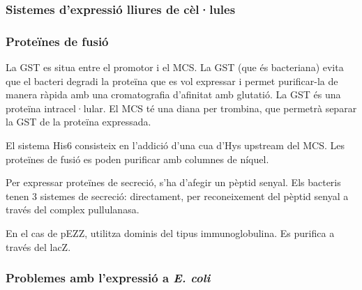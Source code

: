 \subsubsection{Sistemes d'expressió lliures de cèl·lules}
\label{sec:sist-dexpr-lliur}



\subsubsection{Proteïnes de fusió}
\label{sec:proteines-de-fusio}

La GST es situa entre el promotor i el MCS. La GST (que és bacteriana)
evita que el bacteri degradi la proteïna que es vol expressar i permet
purificar-la de manera ràpida amb una cromatografia d'afinitat amb
glutatió. La GST és una proteïna intracel·lular. El MCS té una diana
per trombina, que permetrà separar la GST de la proteïna expressada.

El sistema His6 consisteix en l'addició d'una cua d'Hys upstream del
MCS. Les proteïnes de fusió es poden purificar amb columnes de níquel.

Per expressar proteïnes de secreció, s'ha d'afegir un pèptid
senyal. Els bacteris tenen 3 sistemes de secreció: directament, per
reconeixement del pèptid senyal a través del complex pullulanasa.

En el cas de pEZZ, utilitza dominis del tipus immunoglobulina. Es
purifica a través del lacZ.

\subsubsection{Problemes amb l'expressió a \textit{E. coli}}
\label{sec:probl-amb-lexpr}

